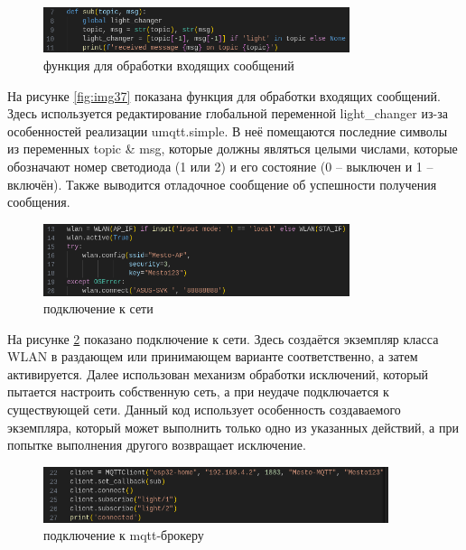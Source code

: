 \begin{figure}[h!]
	\centering
	\includegraphics[width=0.8\textwidth]{./graphics/img/image31.png}
	\caption{функция для обработки входящих сообщений}
	\label{fig:img31}
\end{figure} 

На рисунке \ref{fig:img37} показана функция для обработки входящих сообщений. Здесь используется редактирование глобальной переменной light\_changer из-за особенностей реализации umqtt.simple. В неё помещаются последние символы из переменных topic \& msg, которые должны являться целыми числами, которые обозначают номер светодиода (1 или 2) и его состояние (0 – выключен и 1 – включён). Также выводится отладочное сообщение об успешности получения сообщения.

\begin{figure}[h!]
	\centering
	\includegraphics[width=0.8\textwidth]{./graphics/img/image22.png}
	\caption{подключение к сети}
	\label{fig:img22}
\end{figure}

На рисунке \ref{fig:img22} показано подключение к сети. Здесь создаётся экземпляр класса WLAN в раздающем или принимающем варианте соответственно, а затем активируется. Далее использован механизм обработки исключений, который пытается настроить собственную сеть, а при неудаче подключается к существующей сети. Данный код использует особенность создаваемого экземпляра, который может выполнить только одно из указанных действий, а при попытке выполнения другого возвращает исключение.

\begin{figure}[h!]
	\centering
	\includegraphics[width=0.9\textwidth]{./graphics/img/image27.png}
	\caption{подключение к mqtt-брокеру}
	\label{fig:img27}
\end{figure}


